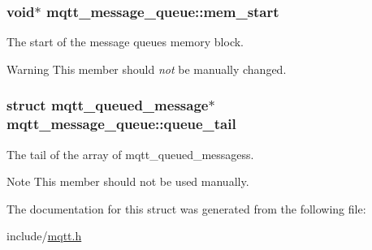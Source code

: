 \subsubsection[{\texorpdfstring{mem\+\_\+start}{mem_start}}]{\setlength{\rightskip}{0pt plus 5cm}void$\ast$ mqtt\+\_\+message\+\_\+queue\+::mem\+\_\+start}\hypertarget{structmqtt__message__queue_a426875f05e72315ed1b34d324b60ac9b}{}\label{structmqtt__message__queue_a426875f05e72315ed1b34d324b60ac9b}


The start of the message queue\textquotesingle{}s memory block. 

\begin{DoxyWarning}{Warning}
This member should {\itshape not} be manually changed. 
\end{DoxyWarning}
\subsubsection[{\texorpdfstring{queue\+\_\+tail}{queue_tail}}]{\setlength{\rightskip}{0pt plus 5cm}struct {\bf mqtt\+\_\+queued\+\_\+message}$\ast$ mqtt\+\_\+message\+\_\+queue\+::queue\+\_\+tail}\hypertarget{structmqtt__message__queue_a7b3bbfe183900ced02927b883486d522}{}\label{structmqtt__message__queue_a7b3bbfe183900ced02927b883486d522}


The tail of the array of mqtt\+\_\+queued\+\_\+messages\textquotesingle{}s. 

\begin{DoxyNote}{Note}
This member should not be used manually. 
\end{DoxyNote}


The documentation for this struct was generated from the following file\+:\begin{DoxyCompactItemize}
\item 
include/\hyperlink{mqtt_8h}{mqtt.\+h}\end{DoxyCompactItemize}

